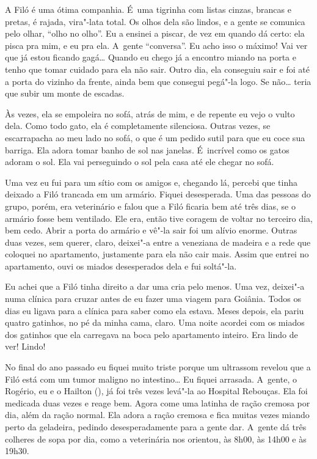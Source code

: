 A Filó é uma ótima companhia. É~uma tigrinha com listas cinzas, brancas
e pretas, é rajada, vira"-lata total. Os olhos dela são lindos, e a gente
se comunica pelo olhar, ``olho no olho''. Eu a ensinei a piscar, de vez
em quando dá certo: ela pisca pra mim, e eu pra ela. A~gente
``conversa''. Eu acho isso o máximo! Vai ver que já estou ficando
gagá… Quando eu chego já a encontro miando na porta e tenho que
tomar cuidado para ela não sair. Outro dia, ela conseguiu sair e foi até
a porta do vizinho da frente, ainda bem que consegui pegá"-la logo. Se
não… teria que subir um monte de escadas.

Às vezes, ela se empoleira no sofá, atrás de mim, e de repente eu vejo o
vulto dela. Como todo gato, ela é completamente silenciosa. Outras
vezes, se escarrapacha ao meu lado no sofá, o que é um pedido sutil para
que eu coce sua barriga. Ela adora tomar banho de sol nas janelas. É~incrível como os gatos adoram o sol. Ela vai perseguindo o sol pela casa
até ele chegar no sofá.

Uma vez eu fui para um sítio com os amigos e, chegando lá, percebi que
tinha deixado a Filó trancada em um armário. Fiquei desesperada. Uma das
pessoas do grupo, porém, era veterinário e falou que a Filó ficaria bem
até três dias, se o armário fosse bem ventilado. Ele era, então tive
coragem de voltar no terceiro dia, bem cedo. Abrir a porta do armário e
vê"-la sair foi um alívio enorme. Outras duas vezes, sem querer, claro,
deixei"-a entre a veneziana de madeira e a rede que coloquei no
apartamento, justamente para ela não cair mais. Assim que entrei no
apartamento, ouvi os miados desesperados dela e fui soltá"-la.

Eu achei que a Filó tinha direito a dar uma cria pelo menos. Uma vez,
deixei"-a numa clínica para cruzar antes de eu fazer uma viagem para
Goiânia. Todos os dias eu ligava para a clínica para saber como ela
estava. Meses depois, ela pariu quatro gatinhos, no pé da minha cama,
claro. Uma noite acordei com os miados dos gatinhos que ela carregava na
boca pelo apartamento inteiro. Era lindo de ver! Lindo!

No final do ano passado eu fiquei muito triste porque um ultrassom
revelou que a Filó está com um tumor maligno no intestino… Eu
fiquei arrasada. A~gente, o Rogério, eu e o Hailton (), já foi três
vezes levá"-la ao Hospital Rebouças. Ela foi medicada duas vezes e reage
bem. Agora come uma latinha de ração cremosa por dia, além da ração
normal. Ela adora a ração cremosa e fica muitas vezes miando perto da
geladeira, pedindo desesperadamente para a gente dar. A~gente dá três
colheres de sopa por dia, como a veterinária nos orientou, às 8h00, às
14h00 e às 19h30.

